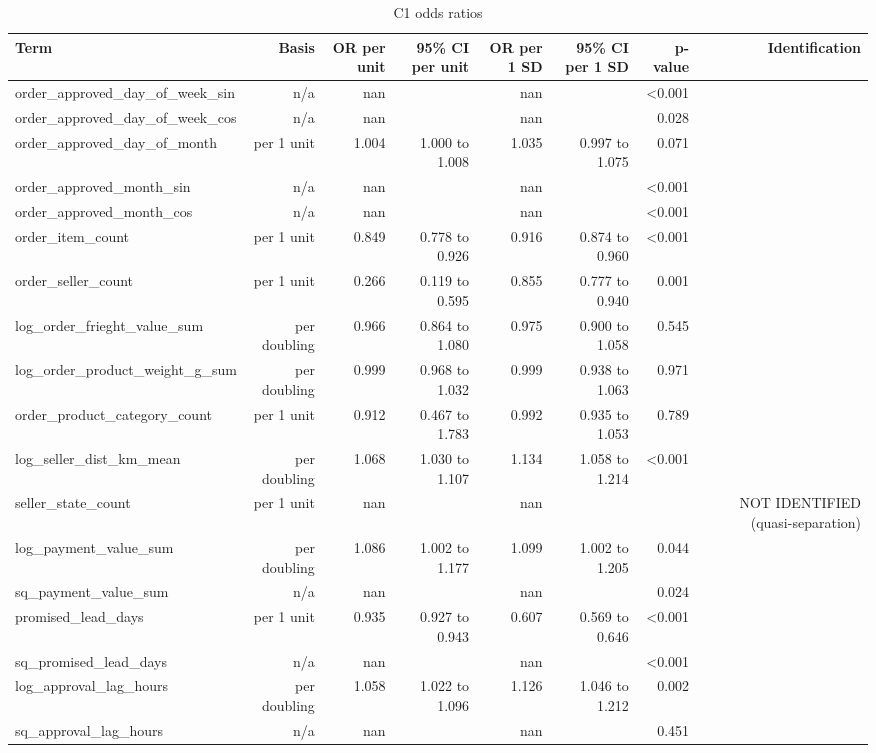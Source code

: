 \begin{table}[htbp]
\centering
\small
\caption{C1 odds ratios}
\begin{tabular}{lrrrrrrr}
\toprule
Term & Basis & OR per unit & 95\% CI per unit & OR per 1 SD & 95\% CI per 1 SD & p-value & Identification \\
\midrule
order\_approved\_day\_of\_week\_sin & n/a & nan &  & nan &  & <0.001 &  \\
order\_approved\_day\_of\_week\_cos & n/a & nan &  & nan &  & 0.028 &  \\
order\_approved\_day\_of\_month & per 1 unit & 1.004 & 1.000 to 1.008 & 1.035 & 0.997 to 1.075 & 0.071 &  \\
order\_approved\_month\_sin & n/a & nan &  & nan &  & <0.001 &  \\
order\_approved\_month\_cos & n/a & nan &  & nan &  & <0.001 &  \\
order\_item\_count & per 1 unit & 0.849 & 0.778 to 0.926 & 0.916 & 0.874 to 0.960 & <0.001 &  \\
order\_seller\_count & per 1 unit & 0.266 & 0.119 to 0.595 & 0.855 & 0.777 to 0.940 & 0.001 &  \\
log\_order\_frieght\_value\_sum & per doubling & 0.966 & 0.864 to 1.080 & 0.975 & 0.900 to 1.058 & 0.545 &  \\
log\_order\_product\_weight\_g\_sum & per doubling & 0.999 & 0.968 to 1.032 & 0.999 & 0.938 to 1.063 & 0.971 &  \\
order\_product\_category\_count & per 1 unit & 0.912 & 0.467 to 1.783 & 0.992 & 0.935 to 1.053 & 0.789 &  \\
log\_seller\_dist\_km\_mean & per doubling & 1.068 & 1.030 to 1.107 & 1.134 & 1.058 to 1.214 & <0.001 &  \\
seller\_state\_count & per 1 unit & nan &  & nan &  &  & NOT IDENTIFIED (quasi-separation) \\
log\_payment\_value\_sum & per doubling & 1.086 & 1.002 to 1.177 & 1.099 & 1.002 to 1.205 & 0.044 &  \\
sq\_payment\_value\_sum & n/a & nan &  & nan &  & 0.024 &  \\
promised\_lead\_days & per 1 unit & 0.935 & 0.927 to 0.943 & 0.607 & 0.569 to 0.646 & <0.001 &  \\
sq\_promised\_lead\_days & n/a & nan &  & nan &  & <0.001 &  \\
log\_approval\_lag\_hours & per doubling & 1.058 & 1.022 to 1.096 & 1.126 & 1.046 to 1.212 & 0.002 &  \\
sq\_approval\_lag\_hours & n/a & nan &  & nan &  & 0.451 &  \\

\end{tabular}
\end{table}
